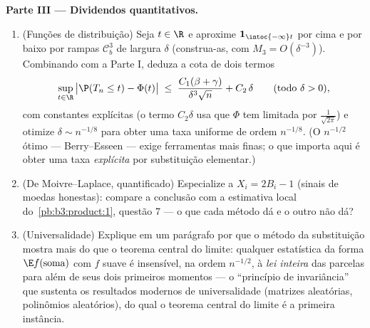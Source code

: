 \begin{problem}
\medskip
\noindent\textbf{Parte III --- Dividendos quantitativos.}
\begin{enumerate}[resume]
  \item (Funções de distribuição) Seja $t \in \R$ e aproxime $\mathbf 1_{\intoc{-\infty}t}$ por cima e
        por baixo por rampas $\mathcal C^3_b$ de largura $\delta$ (construa-as,
        com $M_3 = O(\delta^{-3})$). Combinando com a Parte I, deduza a cota de dois
        termos
        \[
        \sup_{t\in\R}\,\bigl|\P(T_n \leq t) -
        \Phi(t)\bigr| \;\leq\;
        \frac{C_1(\beta + \gamma)}{\delta^3\sqrt n} +
        C_2\,\delta
        \qquad (\text{todo } \delta > 0),
        \]
        com constantes explícitas (o termo $C_2\delta$ usa que $\Phi$ tem
         limitada por $\frac1{\sqrt{2\pi}}$) e otimize $\delta \sim
        n^{-1/8}$ para obter uma taxa
        uniforme de ordem $n^{-1/8}$. (O $n^{-1/2}$ ótimo --- Berry--Esseen ---
        exige ferramentas mais finas; o que importa aqui é obter uma
        taxa \emph{explícita} por substituição elementar.)
  \item (De Moivre--Laplace, quantificado) Especialize a $X_i = 2B_i - 1$ (sinais
        de moedas honestas): compare a conclusão com a estimativa local
        do~\cref{pb:b3:product:1}, questão 7 --- o que cada método dá e o outro
        não dá?
  \item (Universalidade) Explique em um parágrafo por que o método da
        substituição mostra mais do que o teorema central do limite:
        qualquer estatística da forma $\E f(\text{soma})$ com $f$ suave é
        insensível, na ordem $n^{-1/2}$, à \emph{lei inteira} das parcelas
        para além de seus dois primeiros momentos --- o ``princípio de
        invariância'' que sustenta os resultados modernos de
        universalidade (matrizes aleatórias, polinômios aleatórios), do
        qual o teorema central do limite é a primeira instância.
\end{enumerate}


\end{problem}
